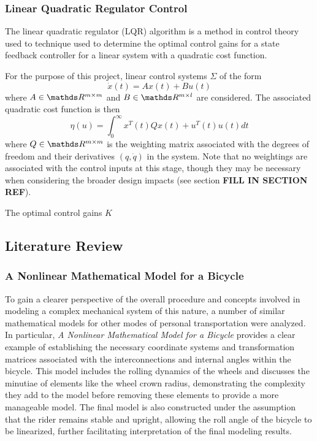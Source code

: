 \subsubsection{Linear Quadratic Regulator Control}
The linear quadratic regulator (LQR) algorithm is a method in control theory used to technique used to determine the optimal control gains for a state feedback controller for a linear system with a quadratic cost function.

For the purpose of this project, linear control systems $\Sigma$ of the form
\begin{equation}
\dot{x}(t) = Ax(t) + Bu(t)
\end{equation}
where $A \in \R^{m \times m}$ and $B \in \R^{m \times l}$ are considered.
The associated quadratic cost function is then 
\begin{equation}
\eta(u) = \int_{0}^{\infty}x^{T}(t)Qx(t)+u^{T}(t)u(t)dt
\end{equation}
where $Q \in \R^{m \times m}$ is the weighting matrix associated with the degrees of freedom and their derivatives $(q, \dot{q})$ in the system. Note that no weightings are associated with the control inputs at this stage, though they may be necessary when considering the broader design impacts (see section \textbf{FILL IN SECTION REF}).

The optimal control gains $K$ 

\subsection{Literature Review}
\subsubsection{A Nonlinear Mathematical Model for a Bicycle}
To gain a clearer perspective of the overall procedure and concepts involved in modeling a complex mechanical system of this nature, a number of similar mathematical models for other modes of personal transportation were analyzed.
In particular, \textit{A Nonlinear Mathematical Model for a Bicycle} \cite{bicycle} provides a clear example of establishing the necessary coordinate systems and transformation matrices associated with the interconnections and internal angles within the bicycle.
This model includes the rolling dynamics of the wheels and discusses the minutiae of elements like the wheel crown radius, demonstrating the complexity they add to the model before removing these elements to provide a more manageable model.
The final model is also constructed under the assumption that the rider remains stable and upright, allowing the roll angle of the bicycle to be linearized, further facilitating interpretation of the final modeling results. 

